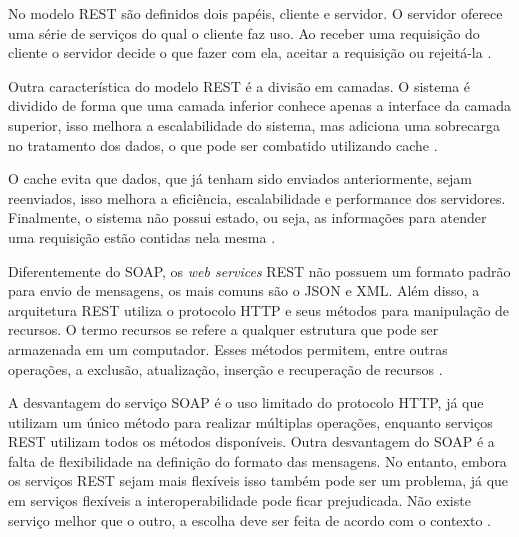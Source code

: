 No modelo REST são definidos dois papéis, cliente e servidor. O servidor oferece uma série 
de serviços do qual o cliente faz uso. Ao receber uma requisição do cliente o servidor decide 
o que fazer com ela, aceitar a requisição ou rejeitá-la \cite{fielding2000architectural}.

Outra característica do modelo REST é a divisão em camadas. O sistema é dividido de forma que 
uma camada inferior conhece apenas a interface da camada superior, isso melhora a 
escalabilidade do sistema, mas adiciona uma sobrecarga no tratamento dos dados, o que pode 
ser combatido utilizando cache \cite{fielding2000architectural}. 

O cache evita que dados, que já tenham sido enviados anteriormente, sejam reenviados, isso 
melhora a eficiência, escalabilidade e performance dos servidores. Finalmente, o sistema 
não possui estado, ou seja, as informações para atender uma requisição estão contidas nela 
mesma \cite{fielding2000architectural}.

Diferentemente do SOAP, os \textit{web services} REST não possuem um formato padrão para envio 
de mensagens, os mais comuns são o JSON e XML. Além disso, a arquitetura REST utiliza o 
protocolo HTTP e seus métodos para manipulação de recursos. O termo recursos se refere a 
qualquer estrutura que pode ser armazenada em um computador. Esses métodos permitem, entre 
outras operações, a exclusão, atualização, inserção e recuperação de recursos \cite{lima2012}.

A desvantagem do serviço SOAP é o uso limitado do protocolo HTTP, já que utilizam um único 
método para realizar múltiplas operações, enquanto serviços REST utilizam todos os métodos 
disponíveis. Outra desvantagem do SOAP é a falta de flexibilidade na definição do formato 
das mensagens. No entanto, embora os serviços REST sejam mais flexíveis isso também pode ser 
um problema, já que em serviços flexíveis a interoperabilidade pode ficar prejudicada. Não 
existe serviço melhor que o outro, a escolha deve ser feita de acordo com o contexto 
\cite{lima2012}.